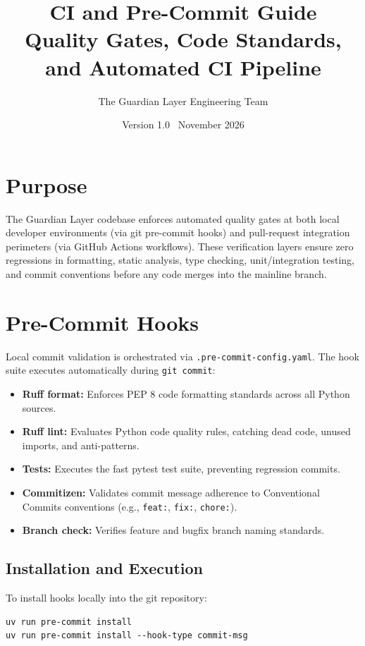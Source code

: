 \documentclass[11pt,a4paper]{article}
\title{\sffamily\bfseries\huge CI and Pre-Commit Guide\\[0.3em]
\Large Quality Gates, Code Standards, and Automated CI Pipeline}
\author{\textsf{The Guardian Layer Engineering Team}}
\date{\textsf{Version 1.0 \textbar\ November 2026}}
\begin{document}
\maketitle
\thispagestyle{fancy}

\section{Purpose}
The Guardian Layer codebase enforces automated quality gates at both local developer environments (via git pre-commit hooks) and pull-request integration perimeters (via GitHub Actions workflows). These verification layers ensure zero regressions in formatting, static analysis, type checking, unit/integration testing, and commit conventions before any code merges into the mainline branch.

\section{Pre-Commit Hooks}
Local commit validation is orchestrated via \texttt{.pre-commit-config.yaml}. The hook suite executes automatically during \texttt{git commit}:

\begin{itemize}[leftmargin=*,itemsep=2pt]
  \item \textbf{Ruff format:} Enforces PEP 8 code formatting standards across all Python sources.
  \item \textbf{Ruff lint:} Evaluates Python code quality rules, catching dead code, unused imports, and anti-patterns.
  \item \textbf{Tests:} Executes the fast pytest test suite, preventing regression commits.
  \item \textbf{Commitizen:} Validates commit message adherence to Conventional Commits conventions (e.g., \texttt{feat:}, \texttt{fix:}, \texttt{chore:}).
  \item \textbf{Branch check:} Verifies feature and bugfix branch naming standards.
\end{itemize}

\subsection{Installation and Execution}
To install hooks locally into the git repository:
\begin{lstlisting}
uv run pre-commit install
uv run pre-commit install --hook-type commit-msg
\end{lstlisting}
\end{document}
